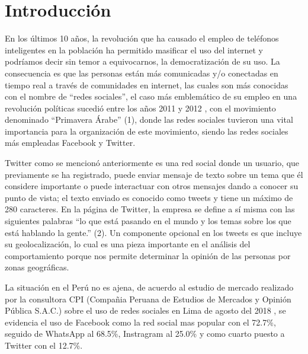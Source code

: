 \chapter{Introducci\'on}
\label{intro}

En los últimos 10 años, la revolución que ha causado el empleo de teléfonos inteligentes en la población 
ha permitido masificar el uso del internet y podríamos decir sin temor a equivocarnos, la democratización de su uso.
 La consecuencia es que las personas están más comunicadas y/o conectadas en tiempo real a través  de comunidades 
 en internet, las cuales son más conocidas con el nombre de “redes sociales”, el caso más emblemático de su empleo 
 en una revolución políticas sucedió entre los años 2011 y 2012 , con el movimiento denominado  “Primavera Árabe” (1), 
 donde las redes sociales tuvieron una vital importancia para la organización de este movimiento, siendo las redes 
 sociales más empleadas Facebook y Twitter. 
      
Twitter como se mencionó anteriormente es una red social donde un usuario, que previamente se ha registrado, 
puede enviar mensaje de texto sobre un tema que él considere importante o puede interactuar con otros mensajes 
dando a conocer su punto de vista; el texto enviado es conocido como tweets y tiene un máximo de 280 caracteres. 
En la página de Twitter, la empresa se define a sí misma con las siguientes palabras “lo que está pasando en el 
mundo y los temas sobre los que está hablando la gente.” (2). Un componente opcional en los tweets es que incluye 
su geolocalización, lo cual es una pieza importante en el análisis del comportamiento porque nos permite determinar 
la opinión de las personas por zonas geográficas. 

La situaci\'on en el Per\'u no es ajena, de acuerdo al estudio de mercado realizado por la consultora CPI (Compa\~nia Peruana de Estudios de Mercados y Opini\'on P\'ublica S.A.C.) sobre el uso de redes sociales en Lima de agosto del 2018 , se evidencia el uso de Facebook como la red social mas popular con el 72.7\%, seguido de WhatsApp al 68.5\%, Instragram al 25.0\% y como cuarto puesto a Twitter con el 12.7\%. 


